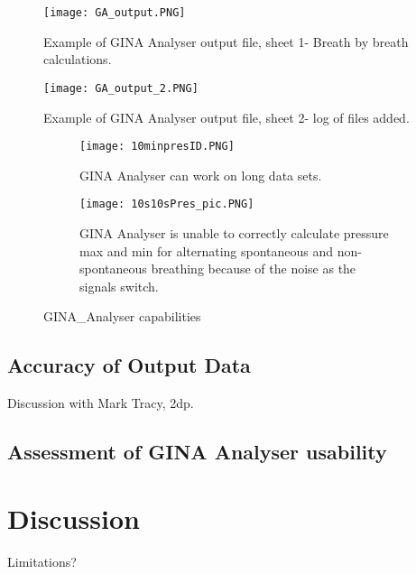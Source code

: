 \documentclass[12pt, openany, oneside]{book}
\begin{document}
\begin{landscape}
\begin{figure}
\texttt{[image: GA\_output.PNG]}
		\label{fig:out1}
		\caption[GINA Analyser output file, breath by breath data]{Example of GINA Analyser output file, sheet 1- Breath by breath calculations.}

\end{figure}
\end{landscape}

\begin{figure}
\texttt{[image: GA\_output\_2.PNG]}
		\label{fig:out2}
		\caption[GINA Analyser output file, data log]{Example of GINA Analyser output file, sheet 2- log of files added.}
\end{figure}



\begin{figure}
	\begin{subfigure}[t]{0.49\textwidth}
		\centering
		\texttt{[image: 10minpresID.PNG]}		
		\caption[GINA Analyser can work on long data sets.] {GINA Analyser can work on long data sets.}
		\label{fig:10min}
	\end{subfigure}
	\hfill
	\begin{subfigure}[t]{0.7\textwidth}
		\centering
		\texttt{[image: 10s10sPres\_pic.PNG]}		
		\caption[GINA Analyser calculating pressure max and min for alternating spontaneous and non-spontaneous breathing.]{GINA Analyser is unable to correctly calculate pressure max and min for alternating spontaneous and non-spontaneous breathing because of the noise as the signals switch.}
		\label{fig:10s10s}
	\end{subfigure}

\caption{GINA\_Analyser capabilities}
	
\end{figure}


\subsection{Accuracy of Output Data}
Discussion with Mark Tracy, 2dp.
\subsection{Assessment of GINA Analyser usability}
\section{Discussion}
Limitations?
\end{document}
